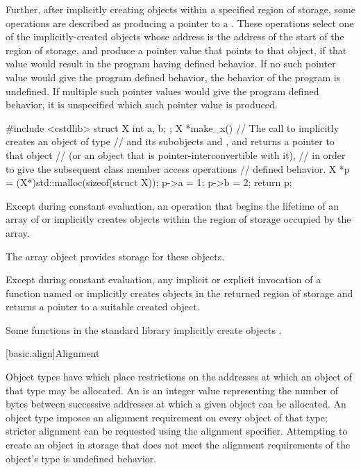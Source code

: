 \pnum
Further, after implicitly creating objects within a specified region of storage,
some operations are described as producing a pointer to a
.
These operations select one of the implicitly-created objects
whose address is the address of the start of the region of storage,
and produce a pointer value that points to that object,
if that value would result in the program having defined behavior.
If no such pointer value would give the program defined behavior,
the behavior of the program is undefined.
If multiple such pointer values would give the program defined behavior,
it is unspecified which such pointer value is produced.

\pnum
\begin{example}
\begin{codeblock}
#include <cstdlib>
struct X { int a, b; };
X *make_x() {
  // The call to  implicitly creates an object of type 
  // and its subobjects  and , and returns a pointer to that  object
  // (or an object that is pointer-interconvertible with it),
  // in order to give the subsequent class member access operations
  // defined behavior.
  X *p = (X*)std::malloc(sizeof(struct X));
  p->a = 1;
  p->b = 2;
  return p;
}
\end{codeblock}
\end{example}

\pnum
Except during constant evaluation,
an operation that begins the lifetime of
an array of  or 
implicitly creates objects within the region of storage occupied by the array.
\begin{note}
The array object provides storage for these objects.
\end{note}
Except during constant evaluation,
any implicit or explicit invocation of a function
named  or 
implicitly creates objects in the returned region of storage and
returns a pointer to a suitable created object.
\begin{note}
Some functions in the \Cpp{} standard library implicitly create objects%
.
\end{note}

[basic.align]{Alignment}

\pnum
Object types have 
which place restrictions on the addresses at which an object of that type
may be allocated. An  is an 
integer value representing the number of bytes between successive addresses
at which a given object can be allocated. An object type imposes an alignment
requirement on every object of that type; stricter alignment can be requested
using the alignment specifier.
Attempting to create an object in storage that
does not meet the alignment requirements of the object's type
is undefined behavior.

